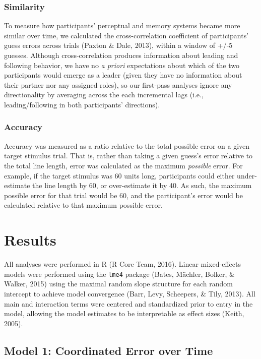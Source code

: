 \documentclass[10pt, letterpaper]{article}
\begin{document}
\subsubsection{Similarity}\label{similarity}

To measure how participants' perceptual and memory systems became more
similar over time, we calculated the cross-correlation coefficient of
participants' guess errors across trials (Paxton \& Dale, 2013), within
a window of +/-5 guesses. Although cross-correlation produces
information about leading and following behavior, we have no \emph{a
priori} expectations about which of the two participants would emerge as
a leader (given they have no information about their partner nor any
assigned roles), so our first-pass analyses ignore any directionality by
averaging across the each incremental lags (i.e., leading/following in
both participants' directions).

\subsubsection{Accuracy}\label{accuracy}

Accuracy was measured as a ratio relative to the total possible error on
a given target stimulus trial. That is, rather than taking a given
guess's error relative to the total line length, error was calculated as
the maximum \emph{possible} error. For example, if the target stimulus
was 60 units long, participants could either under-estimate the line
length by 60, or over-estimate it by 40. As such, the maximum possible
error for that trial would be 60, and the participant's error would be
calculated relative to that maximum possible error.

\section{Results}\label{results}

All analyses were performed in R (R Core Team, 2016). Linear
mixed-effects models were performed using the \texttt{lme4} package
(Bates, Mächler, Bolker, \& Walker, 2015) using the maximal random slope
structure for each random intercept to achieve model convergence (Barr,
Levy, Scheepers, \& Tily, 2013). All main and interaction terms were
centered and standardized prior to entry in the model, allowing the
model estimates to be interpretable as effect sizes (Keith, 2005).

\subsection{Model 1: Coordinated Error over
Time}\label{model-1-coordinated-error-over-time}
\end{document}
